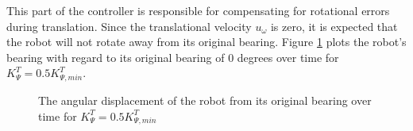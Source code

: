 This part of the controller is responsible for compensating for rotational
errors during translation. Since the translational velocity $u_{\omega}$ is zero,
it is expected that the robot will not rotate away from its original
bearing. Figure \ref{fig:16_0.5_min} plots the robot's bearing with regard to
its original bearing of $0$ degrees over time for $K_{\Psi}^T = 0.5 K_{\Psi, min}^T$.

\begin{figure}[H]\centering
  \scalebox{0.8}{}
  \caption{The angular displacement of the robot from its original bearing over
    time for $K_{\Psi}^T = 0.5 K_{\Psi, min}^T$}
  \label{fig:16_0.5_min}
\end{figure}
